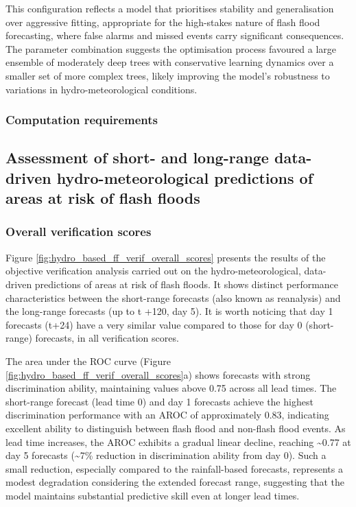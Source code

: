 This configuration reflects a model that prioritises stability and generalisation over aggressive fitting, appropriate for the high-stakes nature of flash flood forecasting, where false alarms and missed events carry significant consequences. The parameter combination suggests the optimisation process favoured a large ensemble of moderately deep trees with conservative learning dynamics over a smaller set of more complex trees, likely improving the model's robustness to variations in hydro-meteorological conditions.

\subsubsection{Computation requirements}



\subsection{Assessment of short- and long-range data-driven hydro-meteorological predictions of areas at risk of flash floods}

\subsubsection{Overall verification scores}

Figure \ref{fig:hydro_based_ff_verif_overall_scores} presents the results of the objective verification analysis carried out on the hydro-meteorological, data-driven predictions of areas at risk of flash floods. It shows distinct performance characteristics between the short-range forecasts (also known as reanalysis) and the long-range forecasts (up to t +120, day 5). It is worth noticing that day 1 forecasts (t+24) have a very similar value compared to those for day 0 (short-range) forecasts, in all verification scores. 

The area under the ROC curve (Figure \ref{fig:hydro_based_ff_verif_overall_scores}a) shows forecasts with strong discrimination ability, maintaining values above 0.75 across all lead times. The short-range forecast (lead time 0) and day 1 forecasts achieve the highest discrimination performance with an AROC of approximately 0.83, indicating excellent ability to distinguish between flash flood and non-flash flood events. As lead time increases, the AROC exhibits a gradual linear decline, reaching \sim0.77 at day 5 forecasts (\sim7\% reduction in discrimination ability from day 0). Such a small reduction, especially compared to the rainfall-based forecasts, represents a modest degradation considering the extended forecast range, suggesting that the model maintains substantial predictive skill even at longer lead times.

